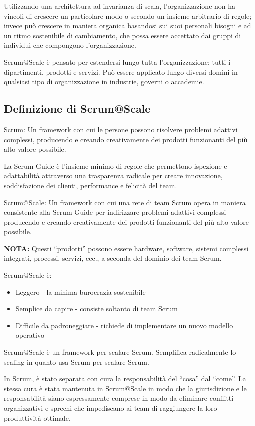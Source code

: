 \documentclass[12pt,a4paper,parskip=full]{scrartcl}
\begin{document}
Utilizzando una architettura ad invarianza di scala, l'organizzazione non ha 
vincoli di crescere un particolare modo o secondo un insieme arbitrario di
regole; invece può crescere in maniera organica basandosi sui suoi personali
bisogni e ad un ritmo sostenibile di cambiamento, che possa essere 
accettato dai gruppi di individui che compongono l'organizzazione.

Scrum@Scale è pensato per estendersi lungo tutta l'organizzazione: tutti
i dipartimenti, prodotti e servizi. Può essere applicato lungo diversi domini
in qualsiasi tipo di organizzazione in industrie, governi o accademie.

\subsection{Definizione di Scrum@Scale}
Scrum: Un framework con cui le persone possono risolvere problemi adattivi complessi,
producendo e creando creativamente dei prodotti funzionanti del più alto valore possibile.

La Scrum Guide è l'insieme minimo di regole che permettono ispezione e adattabilità
attraverso una trasparenza radicale per creare innovazione, soddisfazione dei clienti,
performance e felicità del team.

Scrum@Scale: Un framework con cui una rete di team Scrum opera in maniera consistente
alla Scrum Guide per indirizzare problemi adattivi complessi producendo e creando creativamente dei prodotti funzionanti del più alto valore possibile.

\textbf{NOTA:} Questi ``prodotti'' possono essere hardware, software, sistemi complessi integrati, processi, servizi, ecc., a seconda del dominio dei team Scrum.

Scrum@Scale è:
\begin{itemize}
\item Leggero - la minima burocrazia sostenibile
\item Semplice da capire - consiste soltanto di team Scrum
\item Difficile da padroneggiare - richiede di implementare un nuovo modello operativo
\end{itemize}

Scrum@Scale è un framework per scalare Scrum. Semplifica radicalmente lo scaling 
in quanto usa Scrum per scalare Scrum.

In Scrum, è stato separata con cura la responsabilità del ``cosa'' dal ``come''.
La stessa cura è stata mantenuta in Scrum@Scale in modo che la giurisdizione e le responsabilità siano espressamente comprese in modo da eliminare conflitti organizzativi e sprechi che impediscano ai team di raggiungere la loro produttività ottimale.
\end{document}
